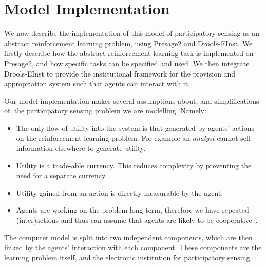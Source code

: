 
\section{Model Implementation}

We now describe the implementation of this model of participatory sensing as an abstract reinforcement learning problem, using Presage2 and Drools-EInst. We firstly describe how the abstract reinforcement learning task is implemented on Presage2, and how specific tasks can be specified and used. We then integrate Drools-EInst to provide the institutional framework for the provision and appropriation system such that agents can interact with it. 

Our model implementation makes several assumptions about, and simplifications of, the participatory sensing problem we are modelling. Namely:

\begin{itemize}
\item The only flow of utility into the system is that generated by agents' actions on the reinforcement learning problem. For example an \emph{analyst} cannot sell information elsewhere to generate utility.
\item Utility is a trade-able currency. This reduces complexity by preventing the need for a separate currency.
\item Utility gained from an action is directly measurable by the agent.
\item Agents are working on the problem long-term, therefore we have repeated (inter)actions and thus can assume that agents are likely to be cooperative~\citep{Axelrod1984}.
\end{itemize}

The computer model is split into two independent components, which are then
linked by the agents' interaction with each component. These components are
the learning problem itself, and the electronic institution for participatory
sensing.

